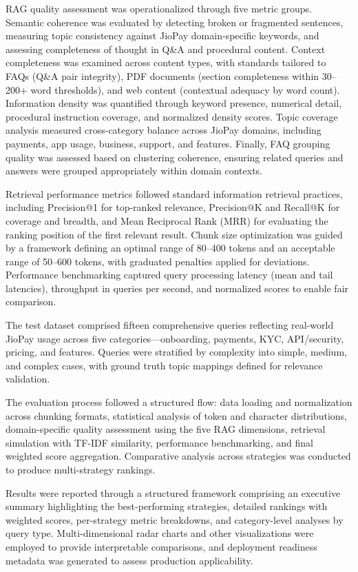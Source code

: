 RAG quality assessment was operationalized through five metric groups. Semantic coherence was evaluated by detecting broken or fragmented sentences, measuring topic consistency against JioPay domain-specific keywords, and assessing completeness of thought in Q\&A and procedural content. Context completeness was examined across content types, with standards tailored to FAQs (Q\&A pair integrity), PDF documents (section completeness within 30–200+ word thresholds), and web content (contextual adequacy by word count). Information density was quantified through keyword presence, numerical detail, procedural instruction coverage, and normalized density scores. Topic coverage analysis measured cross-category balance across JioPay domains, including payments, app usage, business, support, and features. Finally, FAQ grouping quality was assessed based on clustering coherence, ensuring related queries and answers were grouped appropriately within domain contexts.

Retrieval performance metrics followed standard information retrieval practices, including Precision@1 for top-ranked relevance, Precision@K and Recall@K for coverage and breadth, and Mean Reciprocal Rank (MRR) for evaluating the ranking position of the first relevant result. Chunk size optimization was guided by a framework defining an optimal range of 80–400 tokens and an acceptable range of 50–600 tokens, with graduated penalties applied for deviations. Performance benchmarking captured query processing latency (mean and tail latencies), throughput in queries per second, and normalized scores to enable fair comparison.

The test dataset comprised fifteen comprehensive queries reflecting real-world JioPay usage across five categories—onboarding, payments, KYC, API/security, pricing, and features. Queries were stratified by complexity into simple, medium, and complex cases, with ground truth topic mappings defined for relevance validation.

The evaluation process followed a structured flow: data loading and normalization across chunking formats, statistical analysis of token and character distributions, domain-specific quality assessment using the five RAG dimensions, retrieval simulation with TF-IDF similarity, performance benchmarking, and final weighted score aggregation. Comparative analysis across strategies was conducted to produce multi-strategy rankings.

Results were reported through a structured framework comprising an executive summary highlighting the best-performing strategies, detailed rankings with weighted scores, per-strategy metric breakdowns, and category-level analyses by query type. Multi-dimensional radar charts and other visualizations were employed to provide interpretable comparisons, and deployment readiness metadata was generated to assess production applicability.

